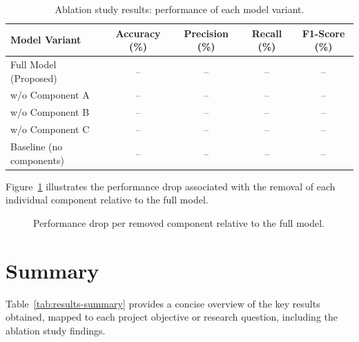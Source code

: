 \begin{table}[ht]
    \centering
    \caption{Ablation study results: performance of each model variant.}
    \label{tab:ablation}
    \begin{tabular}{lcccc}
        \hline
        \textbf{Model Variant} & \textbf{Accuracy (\%)} & \textbf{Precision (\%)}
        & \textbf{Recall (\%)} & \textbf{F1-Score (\%)} \\
        \hline
        Full Model (Proposed)       & -- & -- & -- & -- \\
        w/o Component A             & -- & -- & -- & -- \\
        w/o Component B             & -- & -- & -- & -- \\
        w/o Component C             & -- & -- & -- & -- \\
        Baseline (no components)    & -- & -- & -- & -- \\
        \hline
    \end{tabular}
\end{table}

Figure~\ref{fig:ablation} illustrates the performance drop associated with the
removal of each individual component relative to the full model.

\begin{figure}[ht]
    \centering
    \caption{Performance drop per removed component relative to the full model.}
    \label{fig:ablation}
\end{figure}

\section{Summary}
\label{sec:results-summary}

Table~\ref{tab:results-summary} provides a concise overview of the key results
obtained, mapped to each project objective or research question, including the
ablation study findings.

